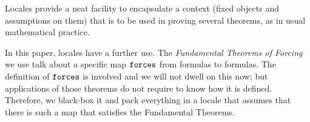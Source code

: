 Locales \cite{ballarin2010tutorial} provide a neat facility to
encapsulate a context (fixed objects and assumptions on them) that is
to be used in proving several theorems, as in usual mathematical
practice. 

In this paper, locales have a further use. The \emph{Fundamental
  Theorems of Forcing} we use talk about a specific map $\mathop{\mathtt{forces}}$
from formulas to formulas. The definition of $\mathop{\mathtt{forces}}$ is involved
and we will not dwell on this now; but applications of those theorems
do not require to know how it is defined. Therefore, we black-box it
and pack everything in a locale that assumes that there is such a
map that satisfies the Fundamental Theorems.


